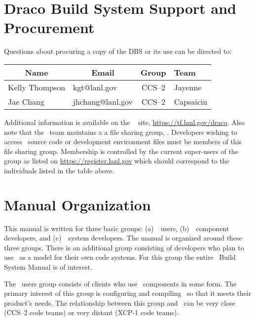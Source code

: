 \section{Draco Build System Support and Procurement}
\label{sec:procurement}
 

Questions about procuring a copy of the DBS or its use can be
directed to:
\begin{center}
  \begin{tabular}{llcl}\hline\hline
    \multicolumn{1}{c}{Name} & \multicolumn{1}{c}{Email} &
    Group & Team \\ \hline
    Kelly Thompson & kgt@lanl.gov     & CCS--2 & Jayenne \\
    Jae Chang      & jhchang@lanl.gov & CCS--2 & Capsaicin \\ \hline\hline
  \end{tabular}
\end{center}  
Additional information is available on the \draco\  
site, \href{https://tf.lanl.gov/draco}{https://tf.lanl.gov/draco}.  Also note that the \draco\ team 
maintains a a  file sharing group,  .  
Developers wishing to access \draco\ source code or development environment files must be members of this file sharing group. 
Membership is controlled by the current super-users of the group as listed on \href{https://register.lanl.gov}{https://register.lanl.gov} 
which should correspond to the individuals listed in the table above.



\section{Manual Organization}

This manual is written for three basic groups: (a)~\draco\ users, (b)~\draco\ component developers, and (c)~\draco\ system developers. The
manual is organized around these three groups. There is an additional
group consisting of developers who plan to use \draco\ as a model for
their own code systems.  For this group the entire \draco\ Build
System Manual is of interest.

The \draco\ users group consists of clients who use \draco\ components
in some form.  The primary interest of this group is configuring  and
compiling  \draco\ so that it meets their product's needs.  The
relationship between this group and \draco\ can be very close (CCS--2
code teams) or very distant (XCP-1 code teams).

